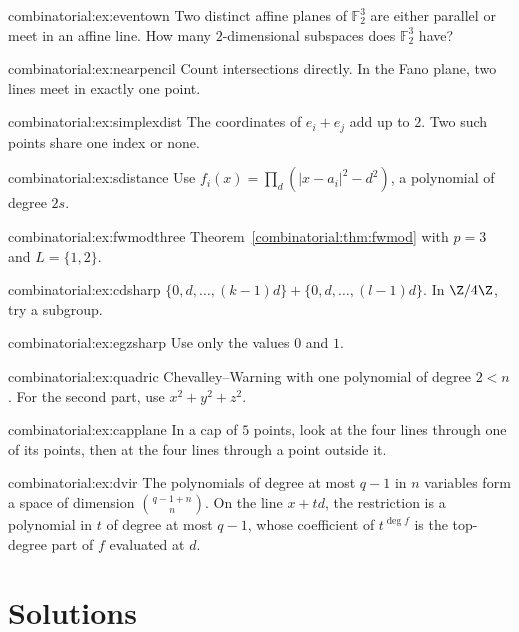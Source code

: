 \begin{hint}{combinatorial:ex:eventown}
Two distinct affine planes of $\mathbb F_2^3$ are either parallel or meet in an affine line. How many $2$-dimensional subspaces does $\mathbb F_2^3$ have?
\end{hint}
\begin{hint}{combinatorial:ex:nearpencil}
Count intersections directly. In the Fano plane, two lines meet in exactly one point.
\end{hint}
\begin{hint}{combinatorial:ex:simplexdist}
The coordinates of $e_i+e_j$ add up to $2$. Two such points share one index or none.
\end{hint}
\begin{hint}{combinatorial:ex:sdistance}
Use $f_i(x)=\prod_{d}(|x-a_i|^2-d^2)$, a polynomial of degree $2s$.
\end{hint}
\begin{hint}{combinatorial:ex:fwmodthree}
Theorem~\ref{combinatorial:thm:fwmod} with $p=3$ and $L=\{1,2\}$.
\end{hint}
\begin{hint}{combinatorial:ex:cdsharp}
$\{0,d,\dots,(k-1)d\}+\{0,d,\dots,(l-1)d\}$. In $\Z/4\Z$, try a subgroup.
\end{hint}
\begin{hint}{combinatorial:ex:egzsharp}
Use only the values $0$ and $1$.
\end{hint}
\begin{hint}{combinatorial:ex:quadric}
Chevalley--Warning with one polynomial of degree $2<n$. For the second part, use $x^2+y^2+z^2$.
\end{hint}
\begin{hint}{combinatorial:ex:capplane}
In a cap of $5$ points, look at the four lines through one of its points, then at the four lines through a point outside it.
\end{hint}
\begin{hint}{combinatorial:ex:dvir}
The polynomials of degree at most $q-1$ in $n$ variables form a space of dimension $\binom{q-1+n}n$. On the line $x+td$, the restriction is a polynomial in $t$ of degree at most $q-1$, whose coefficient
of $t^{\deg f}$ is the top-degree part of $f$ evaluated at $d$.
\end{hint}

\section{Solutions}

